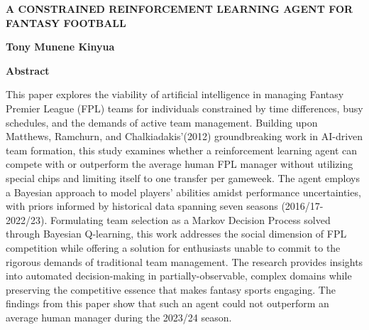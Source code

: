 \thispagestyle{plain}
\begin{center}
    \Large
    \textbf{A CONSTRAINED REINFORCEMENT LEARNING AGENT FOR FANTASY FOOTBALL}
    
    \vspace{0.4cm}
    \large
    
    \vspace{0.4cm}
    \textbf{Tony Munene Kinyua}
    
    \vspace{0.9cm}
    \textbf{Abstract}
\end{center}

This paper explores the viability of artificial intelligence in managing Fantasy Premier League (FPL) teams for individuals constrained by time differences, busy schedules, and the demands of active team management. Building upon Matthews, Ramchurn, and Chalkiadakis'(2012) groundbreaking work in AI-driven team formation, this study examines whether a reinforcement learning agent can compete with or outperform the average human FPL manager without utilizing special chips and limiting itself to one transfer per gameweek. The agent employs a Bayesian approach to model players' abilities amidst performance uncertainties, with priors informed by historical data spanning seven seasons (2016/17-2022/23). Formulating team selection as a Markov Decision Process solved through Bayesian Q-learning, this work addresses the social dimension of FPL competition while offering a solution for enthusiasts unable to commit to the rigorous demands of traditional team management. The research provides insights into automated decision-making in partially-observable, complex domains while preserving the competitive essence that makes fantasy sports engaging. The findings from this paper show that such an agent could not outperform an average human manager during the 2023/24 season.